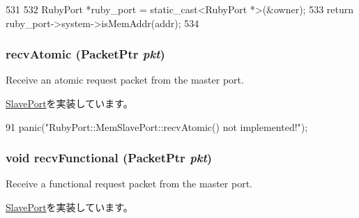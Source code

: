 \begin{DoxyCode}
531 {
532     RubyPort *ruby_port = static_cast<RubyPort *>(&owner);
533     return ruby_port->system->isMemAddr(addr);
534 }
\end{DoxyCode}
\hypertarget{classRubyPort_1_1MemSlavePort_a5f0b4c4a94f6b0053f9d7a4eb9c2518a}{
\subsubsection[{recvAtomic}]{ recvAtomic ({\bf PacketPtr} {\em pkt})}}
\label{classRubyPort_1_1MemSlavePort_a5f0b4c4a94f6b0053f9d7a4eb9c2518a}
Receive an atomic request packet from the master port. 

\hyperlink{classSlavePort_a428ab07671bc9372dc44a2487b12a726}{SlavePort}を実装しています。


\begin{DoxyCode}
91         { panic("RubyPort::MemSlavePort::recvAtomic() not implemented!\n"); }
\end{DoxyCode}
\hypertarget{classRubyPort_1_1MemSlavePort_aeefa907fb6d6a787e6dab90e8138ea90}{
\subsubsection[{recvFunctional}]{\setlength{\rightskip}{0pt plus 5cm}void recvFunctional ({\bf PacketPtr} {\em pkt})}}
\label{classRubyPort_1_1MemSlavePort_aeefa907fb6d6a787e6dab90e8138ea90}
Receive a functional request packet from the master port. 

\hyperlink{classSlavePort_a6a3d6f2e5dab6bed16d53d9e7c17378d}{SlavePort}を実装しています。


